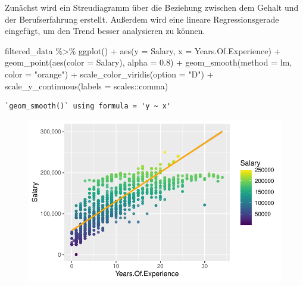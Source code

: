 \documentclass[
  letterpaper,
  DIV=11,
  numbers=noendperiod]{scrartcl}
\newenvironment{Shaded}{\begin{snugshade}}{\end{snugshade}}
\newcommand{\AttributeTok}[1]{\textcolor[rgb]{0.40,0.45,0.13}{#1}}
\newcommand{\FloatTok}[1]{\textcolor[rgb]{0.68,0.00,0.00}{#1}}
\newcommand{\FunctionTok}[1]{\textcolor[rgb]{0.28,0.35,0.67}{#1}}
\newcommand{\NormalTok}[1]{\textcolor[rgb]{0.00,0.23,0.31}{#1}}
\newcommand{\SpecialCharTok}[1]{\textcolor[rgb]{0.37,0.37,0.37}{#1}}
\newcommand{\StringTok}[1]{\textcolor[rgb]{0.13,0.47,0.30}{#1}}
\begin{document}
Zunächst wird ein Streudiagramm über die Beziehung zwischen dem Gehalt
und der Berufserfahrung erstellt. Außerdem wird eine lineare
Regressionsgerade eingefügt, um den Trend besser analysieren zu können.

\begin{Shaded}
\begin{Highlighting}[]
\NormalTok{filtered\_data }\SpecialCharTok{\%\textgreater{}\%}
  \FunctionTok{ggplot}\NormalTok{() }\SpecialCharTok{+}
  \FunctionTok{aes}\NormalTok{(}\AttributeTok{y =}\NormalTok{ Salary, }\AttributeTok{x =}\NormalTok{ Years.Of.Experience) }\SpecialCharTok{+}
  \FunctionTok{geom\_point}\NormalTok{(}\FunctionTok{aes}\NormalTok{(}\AttributeTok{color =}\NormalTok{ Salary), }\AttributeTok{alpha =} \FloatTok{0.8}\NormalTok{) }\SpecialCharTok{+}
  \FunctionTok{geom\_smooth}\NormalTok{(}\AttributeTok{method =}\NormalTok{ lm, }\AttributeTok{color =} \StringTok{"orange"}\NormalTok{) }\SpecialCharTok{+}
  \FunctionTok{scale\_color\_viridis}\NormalTok{(}\AttributeTok{option =} \StringTok{"D"}\NormalTok{) }\SpecialCharTok{+}
  \FunctionTok{scale\_y\_continuous}\NormalTok{(}\AttributeTok{labels =}\NormalTok{ scales}\SpecialCharTok{::}\NormalTok{comma)}
\end{Highlighting}
\end{Shaded}

\begin{verbatim}
`geom_smooth()` using formula = 'y ~ x'
\end{verbatim}

\begin{figure}[H]

{\centering \includegraphics{main_doc_files/figure-pdf/unnamed-chunk-102-1.pdf}

}

\end{figure}
\end{document}
